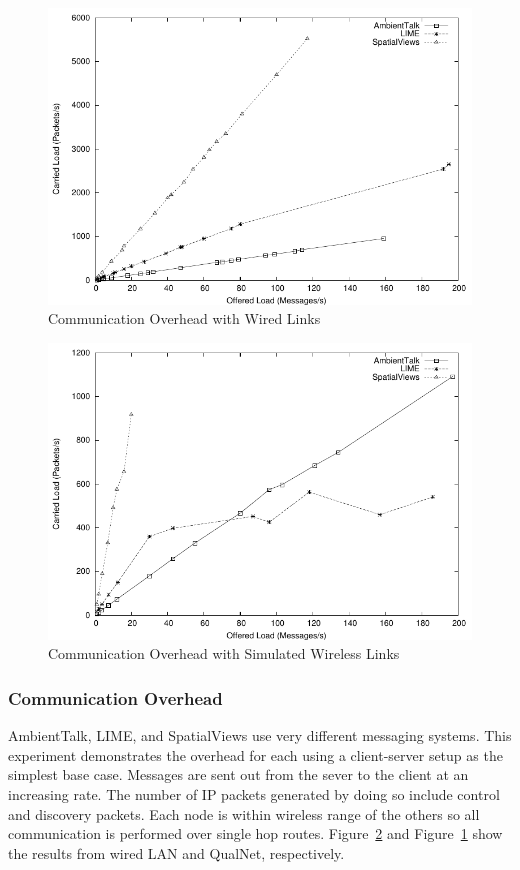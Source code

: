 \begin{figure}
\centering
\includegraphics{figures/overhead-wired.pdf}
\caption{Communication Overhead with Wired Links}
\label{fig:overhead-wired}
\end{figure}

\begin{figure}
\includegraphics{figures/overhead-qualnet.pdf}
\caption{Communication Overhead with Simulated Wireless Links}
\label{fig:overhead-qualnet}
\end{figure}

\subsubsection{Communication Overhead}

AmbientTalk, LIME, and SpatialViews use very different messaging systems. This experiment demonstrates the overhead for each using a client-server setup as the simplest base case. Messages are sent out from the sever to the client at an increasing rate. The number of IP packets generated by doing so include control and discovery packets. Each node is within wireless range of the others so all communication is performed over single hop routes. Figure~\ref{fig:overhead-qualnet} and Figure~\ref{fig:overhead-wired} show the results from wired LAN and QualNet, respectively.


